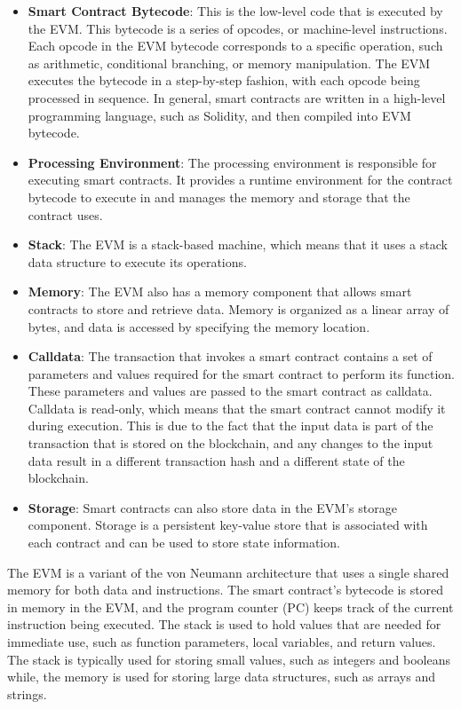 \begin{itemize}
    \item \textbf{Smart Contract Bytecode}: This is the low-level code that is executed by the EVM.
    This bytecode is a series of opcodes, or machine-level instructions.
    Each opcode in the EVM bytecode corresponds to a specific operation, such as arithmetic, conditional branching, or memory manipulation.
    The EVM executes the bytecode in a step-by-step fashion, with each opcode being processed in sequence. 
    In general, smart contracts are written in a high-level programming language, such as Solidity, 
    and then compiled into EVM bytecode.
    \item \textbf{Processing Environment}: The processing environment is responsible for executing smart contracts. It provides a runtime environment for the contract bytecode to execute in and manages the memory and storage that the contract uses.
    \item \textbf{Stack}: The EVM is a stack-based machine, which means that it uses a stack data structure to execute its operations.
    \item \textbf{Memory}: The EVM also has a memory component that allows smart contracts to store and retrieve data. Memory is organized as a linear array of bytes, and data is accessed by specifying the memory location.
    \item \textbf{Calldata}: The transaction that invokes a smart contract contains a set of parameters and values required for the smart contract to perform its function.
    These parameters and values are passed to the smart contract as calldata.
    Calldata is read-only, which means that the smart contract cannot modify it during execution.
    This is due to the fact that the input data is part of the transaction that is stored on the blockchain, and any changes to the input data result in a different transaction hash and a different state of the blockchain. 
    \item \textbf{Storage}: Smart contracts can also store data in the EVM's storage component. Storage is a persistent key-value store that is associated with each contract and can be used to store state information.
\end{itemize}

The EVM is a variant of the von Neumann architecture that uses a single shared memory for both data and instructions.
The smart contract's bytecode is stored in memory in the EVM, and the program counter (PC) keeps track of the current instruction being executed.
The stack is used to hold values that are needed for immediate use, such as function parameters, local variables, and return values. The stack is typically used for storing small values, such as integers and booleans while, the memory is used for storing large data structures, such as arrays and strings.

